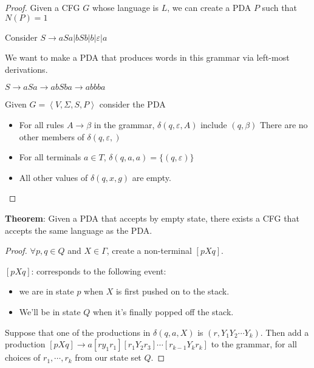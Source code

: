 \documentclass[12pt]{article}
\begin{document}
\begin{proof}
	Given a CFG $G$ whose language is $L$, we can create a PDA $P$ such that
	$N(P) = 1$

	Consider $S \to aSa | bSb | b | \varepsilon | a$

	We want to make a PDA that produces words in this grammar via left-most
	derivations.

	$S \to aSa \to abSba \to abbba$

	

Given $G = \left<V,\Sigma,S,P\right>$ consider the PDA



\begin{itemize}
	\item For all rules $A \to \beta$ in the grammar, $\delta(q,\varepsilon,A)$
		include $(q,\beta)$ There are no other members of
		$\delta(q,\varepsilon,)$
	\item For all terminals $a \in T$, $\delta(q,a,a) = \{ (q,\varepsilon)\}$
	\item All other values of $\delta(q,x,g)$ are empty.
\end{itemize}

\end{proof}

\textbf{Theorem}: Given a PDA that accepts by empty state, there exists a CFG
that accepts the same language as the PDA.

\begin{proof}

	$\forall p,q \in Q$ and $X \in \Gamma$, create a non-terminal
	$\left[pXq\right]$.

	$\left[pXq\right]$: corresponds to the following event:
	\begin{itemize}
		\item we are in state $p$ when $X$ is first pushed on to the stack.
		\item We'll be in state $Q$ when it's finally popped off the stack.
	\end{itemize}

	Suppose that one of the productions in $\delta(q,a,X)$ is $(r,Y_1Y_2\cdots
	Y_k)$. Then add a production $[pXq] \to
	a[ry_1r_1][r_1Y_2r_3]\cdots[r_{k-1}Y_kr_k]$ to the grammar, for all choices
	of $r_1,\cdots,r_k$ from our state set $Q$.  \end{proof}
\end{document}
